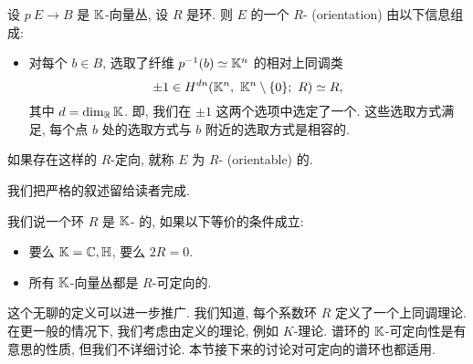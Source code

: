 \begin{definition}
    设 $p \: E \to B$ 是 $\mathbb{K}$-向量丛, 设 $R$ 是环.
    则 $E$ 的一个 $R$- (orientation) 由以下信息组成:
    \begin{itemize}
        \item
            对每个 $b \in B$, 选取了纤维 $p^{-1} (b) \simeq \mathbb{K}^n$
            的相对上同调类
            \[ \pm 1 \in
                H^{dn} (\mathbb{K}^n,\ \mathbb{K}^n \setminus \{ 0 \}; \ R) \simeq R, \]
            其中 $d = \dim_{\mathbb{R}} \mathbb{K}$.
            即, 我们在 $\pm 1$ 这两个选项中选定了一个.
            这些选取方式满足,
            每个点 $b$ 处的选取方式与 $b$ 附近的选取方式是相容的.
    \end{itemize}
    如果存在这样的 $R$-定向, 就称 $E$ 为 $R$- (orientable) 的.
\end{definition}

我们把严格的叙述留给读者完成.

\begin{definition}
    我们说一个环 $R$ 是 $\mathbb{K}$- 的, 如果以下等价的条件成立:
    \begin{itemize}
        \item
            要么 $\mathbb{K} = \mathbb{C}, \mathbb{H}$, 要么 $2R = 0$.
        \item
            所有 $\mathbb{K}$-向量丛都是 $R$-可定向的.
    \end{itemize}
\end{definition}

\begin{remark}
    这个无聊的定义可以进一步推广.
    我们知道, 每个系数环 $R$ 定义了一个上同调理论.
    在更一般的情况下, 我们考虑由定义的理论, 例如 $K$-理论.
    谱环的 $\mathbb{K}$-可定向性是有意思的性质, 但我们不详细讨论.
    本节接下来的讨论对可定向的谱环也都适用. \varqed
\end{remark}

